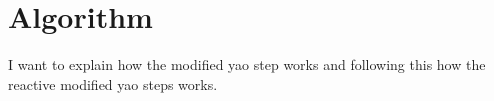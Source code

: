 \section{Algorithm}

I want to explain how the modified yao step works and following this how the reactive modified yao steps works.